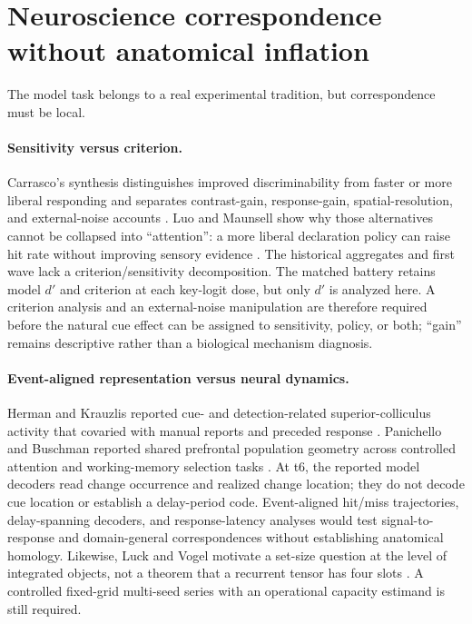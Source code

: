 \documentclass[11pt,a4paper]{article}
\begin{document}
\section{Neuroscience correspondence without anatomical inflation}
The model task belongs to a real experimental tradition, but correspondence must be local.

\paragraph{Sensitivity versus criterion.} Carrasco's synthesis distinguishes improved discriminability from faster or more liberal responding and separates contrast-gain, response-gain, spatial-resolution, and external-noise accounts \cite{carrasco2011}. Luo and Maunsell show why those alternatives cannot be collapsed into ``attention'': a more liberal declaration policy can raise hit rate without improving sensory evidence \cite{luo2018}. The historical aggregates and first wave lack a criterion/sensitivity decomposition. The matched battery retains model $d'$ and criterion at each key-logit dose, but only $d'$ is analyzed here. A criterion analysis and an external-noise manipulation are therefore required before the natural cue effect can be assigned to sensitivity, policy, or both; ``gain'' remains descriptive rather than a biological mechanism diagnosis.

\paragraph{Event-aligned representation versus neural dynamics.} Herman and Krauzlis reported cue- and detection-related superior-colliculus activity that covaried with manual reports and preceded response \cite{herman2017}. Panichello and Buschman reported shared prefrontal population geometry across controlled attention and working-memory selection tasks \cite{panichello2021}. At t6, the reported model decoders read change occurrence and realized change location; they do not decode cue location or establish a delay-period code. Event-aligned hit/miss trajectories, delay-spanning decoders, and response-latency analyses would test signal-to-response and domain-general correspondences without establishing anatomical homology. Likewise, Luck and Vogel motivate a set-size question at the level of integrated objects, not a theorem that a recurrent tensor has four slots \cite{luck1997}. A controlled fixed-grid multi-seed series with an operational capacity estimand is still required.
\end{document}
